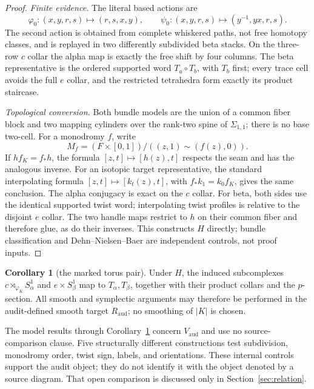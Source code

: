 \documentclass[11pt]{article}
\theoremstyle{definition}
\newtheorem{corollary}[theorem]{Corollary}
\begin{document}
\begin{proof}
\emph{Finite evidence.}  The literal based actions are
\[
 \varphi_0:(x,y,r,s)\mapsto(r,s,x,y),\qquad
 \psi_0:(x,y,r,s)\mapsto(y^{-1},yx,r,s).
\]
The second action is obtained from complete whiskered paths, not free
homotopy classes, and is replayed in two differently subdivided beta stacks.
On the three-row $c$ collar the alpha map is exactly the free shift by four
columns.  The beta representative is the ordered supported word
$T_a\circ T_b$, with $T_b$ first; every trace cell avoids the full
$e$ collar, and the restricted tetrahedra form exactly its product staircase.

\emph{Topological conversion.}  Both bundle models are the union of a
common fiber block and two mapping cylinders over the rank-two spine of
$\Sigma_{1,1}$; there is no base two-cell.  For a monodromy $f$, write
\[
 M_f=(F\times[0,1])/((z,1)\sim(f(z),0)).
\]
If $hf_K=f_*h$, the formula $[z,t]\mapsto[h(z),t]$ respects the seam and
has the analogous inverse.  For an isotopic target representative, the
standard interpolating formula
$[z,t]\mapsto[k_t(z),t]$, with
$f_*k_1=k_0f_K$, gives the same conclusion.  The alpha conjugacy is exact
on the $c$ collar.  For beta, both sides use the identical supported twist
word; interpolating twist profiles is relative to the disjoint $e$ collar.
The two handle maps restrict to $h$ on their common fiber and therefore
glue, as do their inverses.  This constructs $H$ directly; bundle
classification and Dehn--Nielsen--Baer are independent controls, not proof
inputs.
\end{proof}

\begin{corollary}[the marked torus pair]\label{cor:tori}
Under $H$, the induced subcomplexes
$c\rtimes_{\varphi_K}S^1_\alpha$ and $e\times S^1_\beta$ map to
$T_\alpha,T_\beta$, together with their product collars and the $p$-section.
All smooth and symplectic arguments may therefore be performed in the
audit-defined smooth target $R_{\mathrm{aud}}$; no smoothing of $|K|$ is chosen.
\end{corollary}

The model results through Corollary~\ref{cor:tori} concern $V_{\mathrm{aud}}$
and use no source-comparison clause.  Five structurally different
constructions test subdivision, monodromy order, twist sign, labels, and
orientations.  These internal controls support the audit object; they do not
identify it with the object denoted by a source diagram.  That open
comparison is discussed only in Section~\ref{sec:relation}.
\end{document}
